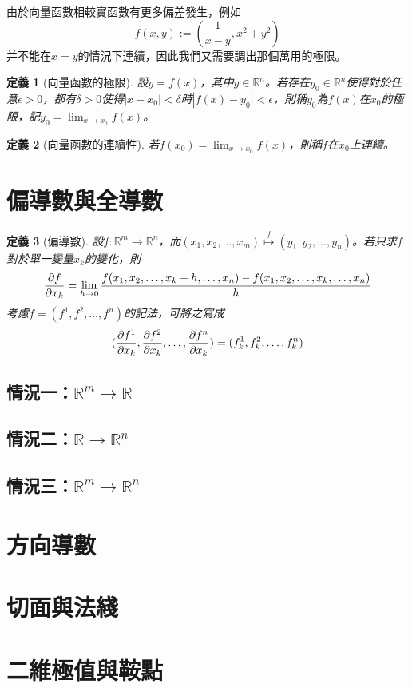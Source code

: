 \documentclass[12pt]{article}
\newtheorem{definition}{定義}
\begin{document}
    由於向量函數相較實函數有更多偏差發生，例如$$f(x,y):=(\frac{1}{x-y},x^2+y^2)$$并不能在$x=y$的情況下連續，因此我們又需要調出那個萬用的極限。

    \begin{definition}[向量函數的極限]
        設$y=f(x)$，其中$y\in\mathbb{R}^n$。若存在$y_0\in\mathbb{R}^n$使得對於任意$\epsilon>0$，都有$\delta>0$使得$|x-x_0|<\delta$時$|f(x)-y_0|<\epsilon$，則稱$y_0$為$f(x)$在$x_0$的極限，記$\displaystyle y_0=\lim_{x\to x_0}f(x)$。
    \end{definition}

    \begin{definition}[向量函數的連續性]
        若$f(x_0)=\displaystyle \lim_{x\to x_0}f(x)$，則稱$f$在$x_0$上連續。
    \end{definition}

    \section*{偏導數與全導數}

    \begin{definition}[偏導數]
        設$f:\mathbb{R}^m\to\mathbb{R}^n$，而$(x_1,x_2,\dots,x_m)\overset{f}{\mapsto}(y_1,y_2,\dots,y_n)$。若只求$f$對於單一變量$x_k$的變化，則$$\partialderivative{f}{x_k}=\lim_{h\to 0}\frac{f(x_1,x_2,\dots,x_k+h,\dots,x_n)-f(x_1,x_2,\dots,x_k,\dots,x_n)}{h}$$
        考慮$f=(f^1,f^2,\dots,f^n)$的記法，可將之寫成$$(\partialderivative{f^1}{x_k},\partialderivative{f^2}{x_k},\dots,\partialderivative{f^n}{x_k})=(f^1_k,f^2_k,\dots,f^n_k)$$
    \end{definition}

    \subsection*{情況一：$\mathbb{R}^m\to\mathbb{R}$}

    \subsection*{情況二：$\mathbb{R}\to\mathbb{R}^n$}

    \subsection*{情況三：$\mathbb{R}^m\to\mathbb{R}^n$}

    \section*{方向導數}

    \section*{切面與法綫}

    \section*{二維極值與鞍點}
\end{document}
